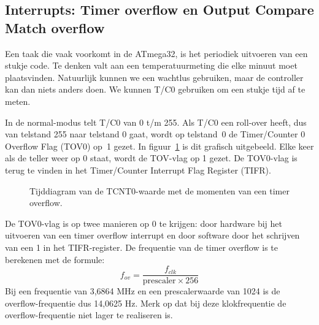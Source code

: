 \subsection{Interrupts: Timer overflow en Output Compare Match overflow}
Een taak die vaak voorkomt in de ATmega32, is het periodiek uitvoeren
van een stukje code. Te denken valt aan een temperatuurmeting die elke
minuut moet plaatsvinden. Natuurlijk kunnen we een wachtlus gebruiken,
maar de controller kan dan niets anders doen. We kunnen T/C0 gebruiken
om een stukje tijd af te meten.

In de normal-modus telt T/C0 van 0 t/m 255.
Als T/C0 een roll-over heeft, dus van telstand 255 naar telstand 0 gaat,
wordt op telstand~0 de Timer/Counter 0 Overflow Flag (TOV0) op~1 gezet.
In figuur~\ref{fig:tc0tov0} is dit grafisch uitgebeeld. Elke keer als
de teller weer op 0 staat, wordt de TOV-vlag op 1 gezet. De TOV0-vlag is
terug te vinden in het Timer/Counter Interrupt Flag Register (TIFR).

\begin{figure}[!ht]
\centering
{}
\caption{Tijddiagram van de TCNT0-waarde met de momenten van een timer overflow.}
\label{fig:tc0tov0}
\end{figure}

De TOV0-vlag is op twee manieren op 0 te krijgen: door hardware bij het
uitvoeren van een timer overflow interrupt en door software door het
schrijven van een 1 in het TIFR-register. De frequentie van de timer overflow
is te berekenen met de formule:
%
\begin{equation}
f_{ov} = \dfrac{f_{clk}}{\mathrm{prescaler}\times 256}
\end{equation}
%
Bij een frequentie van 3,6864 MHz en een prescalerwaarde van 1024 is de
overflow-frequentie dus 14,0625 Hz. Merk op dat bij deze klokfrequentie
de overflow-frequentie niet lager te realiseren is.

